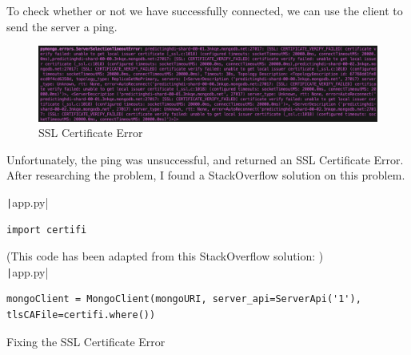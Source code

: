 \documentclass[12pt]{report}
\newcommand{\pil}[1]{\protect\texttt|#1|}
\begin{document}
To check whether or not we have successfully connected, we can use the client to send the server a ping.

\begin{figure}[H]
\centering
\includegraphics[width=14cm]{ss15.4.png}
\caption{SSL Certificate Error}\label{fig:ss15.4}
\end{figure}

\begin{center}
\end{center}

Unfortunately, the ping was unsuccessful, and returned an SSL Certificate Error. After researching the problem, I found a StackOverflow solution \cite{stackOverflowFixSSL} on this problem.

\begin{listing}[H]
\pil{app.py}
\begin{verbatim}
import certifi
\end{verbatim}
(This code has been adapted from this StackOverflow solution: \cite{stackOverflowFixSSL}) \\
\pil{app.py}
\begin{verbatim}
mongoClient = MongoClient(mongoURI, server_api=ServerApi('1'), tlsCAFile=certifi.where())
\end{verbatim}
\caption{Fixing the SSL Certificate Error}\label{cs:fixSSL}
\end{listing}
\end{document}
